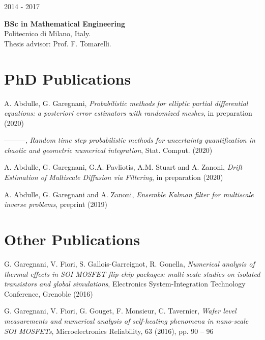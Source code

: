 \begin{minipage}{0.2\linewidth}
	2014 - 2017
\end{minipage}
\begin{minipage}[t]{0.8\linewidth}
	\textbf{BSc in Mathematical Engineering}\\
	Politecnico di Milano, Italy.\\
	Thesis advisor: Prof. F. Tomarelli.
\end{minipage}

\section*{PhD Publications}
\begin{enumerate}[label={[\arabic*]}]
	\item {\sc A. Abdulle, G. Garegnani}, {\em Probabilistic methods for elliptic partial differential equations: a posteriori error estimators with randomized meshes}, in preparation (2020)
	\item ---------, {\em Random time step probabilistic methods for uncertainty quantification in chaotic and geometric numerical integration}, Stat. Comput. (2020)
	\item {\sc A. Abdulle, G. Garegnani, G.A. Pavliotis, A.M. Stuart and A. Zanoni}, {\em Drift Estimation of Multiscale Diffusion via Filtering}, in preparation (2020)
	\item {\sc A. Abdulle, G. Garegnani and A. Zanoni}, {\em Ensemble Kalman filter for multiscale inverse problems}, preprint (2019)
\end{enumerate}

\section*{Other Publications}
\begin{enumerate}[label={[\arabic*]}]
	\item {\sc G. Garegnani, V. Fiori, S. Gallois-Garreignot, R. Gonella}, {\em Numerical analysis of thermal effects in SOI MOSFET flip-chip packages: multi-scale studies on isolated transistors and global simulations}, Electronics System-Integration Technology Conference, Grenoble (2016)
	\item {\sc G. Garegnani, V. Fiori, G. Gouget, F. Monsieur, C. Tavernier}, {\em Wafer level measurements and numerical analysis of self-heating phenomena in nano-scale SOI MOSFETs}, Microelectronics Reliability, 63 (2016), pp. 90 -- 96
\end{enumerate}

